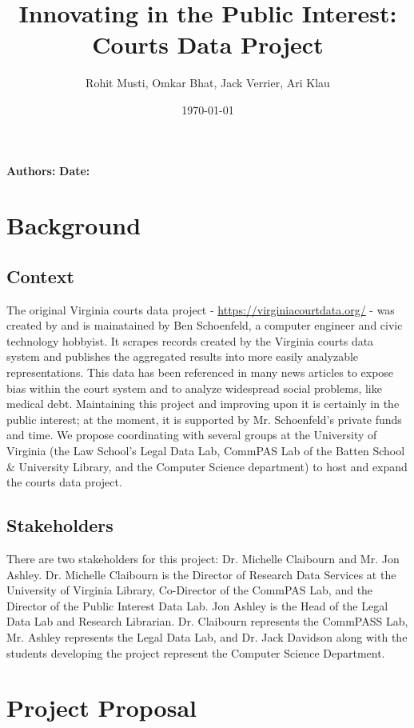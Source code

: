 \documentclass[12pt]{article}
\title{Innovating in the Public Interest:\\Courts Data Project}
\author{Rohit Musti, Omkar Bhat, Jack Verrier, Ari Klau}
\date{\today}
\renewcommand{\maketitle}{
    
    {\noindent\huge\bfseries\thetitle}

    \vspace{0.25em}
    {\noindent \textbf{Authors:} \theauthor} 
    {\noindent \textbf{Date:} \thedate}

}
\begin{document}
 

\maketitle

\section{Background}

\subsection{Context}

\noindent The original Virginia courts data project - \url{https://virginiacourtdata.org/}  -  was created by and is mainatained by Ben Schoenfeld, a computer engineer and civic technology hobbyist.
It scrapes records created by the Virginia courts data system and publishes the aggregated results into more easily analyzable representations.
This data has been referenced in many news articles to expose bias within the court system and to analyze widespread social problems, like medical debt.
Maintaining this project and improving upon it is certainly in the public interest; at the moment, it is supported by Mr. Schoenfeld's private funds and time.
We propose coordinating with several groups at the University of Virginia (the Law School's Legal Data Lab, CommPAS Lab of the Batten School \& University Library, and the Computer Science department) to host and expand the courts data project.

\subsection{Stakeholders}

\noindent There are two stakeholders for this project: Dr. Michelle Claibourn and Mr. Jon Ashley. 
Dr. Michelle Claibourn is the Director of Research Data Services at the University of Virginia Library, Co-Director of the CommPAS Lab, and the Director of the Public Interest Data Lab.
Jon Ashley is the Head of the Legal Data Lab and Research Librarian.
Dr. Claibourn represents the CommPASS Lab, Mr. Ashley represents the Legal Data Lab, and Dr. Jack Davidson along with the students developing the project represent the Computer Science Department.

\section{Project Proposal}
\end{document}

